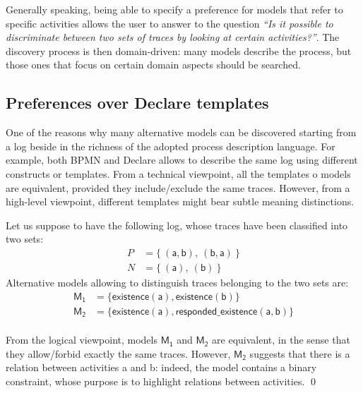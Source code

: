 Generally speaking, being able to specify a preference for models that refer to specific activities allows the user to answer to the question \emph{``Is it possible to discriminate between two sets of traces by looking at certain activities?''}. The discovery process is then domain-driven: many models describe the process, but those ones that focus on certain domain aspects should be searched.




\subsection{Preferences over Declare templates}
\label{subsec:prefOverTemplates}

One of the reasons why many alternative models can be discovered starting from a log beside in the richness of the adopted process description language. For example, both BPMN and Declare allows to describe the same log using different constructs or templates. From a technical viewpoint, all the templates o models are equivalent, provided they include/exclude the same traces.
%
However, from a high-level viewpoint, different templates might bear subtle meaning distinctions.

\begin{example}
\label{ex:unaryVsBinary}
Let us suppose to have the following log, whose traces have been classified into two sets:
%
\begin{align*}
P & = \{\ (\mathsf{a}, \mathsf{b}),\ (\mathsf{b}, \mathsf{a})\ \} \\
N & = \{\ (\mathsf{a}),\ (\mathsf{b})\ \}
\end{align*}
%
Alternative models allowing to distinguish traces belonging to the two sets are:
\begin{align*}
\mathsf{M_1} & = \{ \mathsf{existence(a),existence(b)}\} \\
\mathsf{M_2} & = \{ \mathsf{existence(a), responded\_existence(a, b)}\}
\end{align*}
%
\\
From the logical viewpoint, models $\mathsf{M_1}$ and $\mathsf{M_2}$ are equivalent, in the sense that they allow/forbid exactly the same traces. However, $\mathsf{M_2}$ suggests that there is a relation between activities \textsf{a} and \textsf{b}: indeed, the model contains a binary constraint, whose purpose is to highlight relations between activities.
\qed
\end{example}

